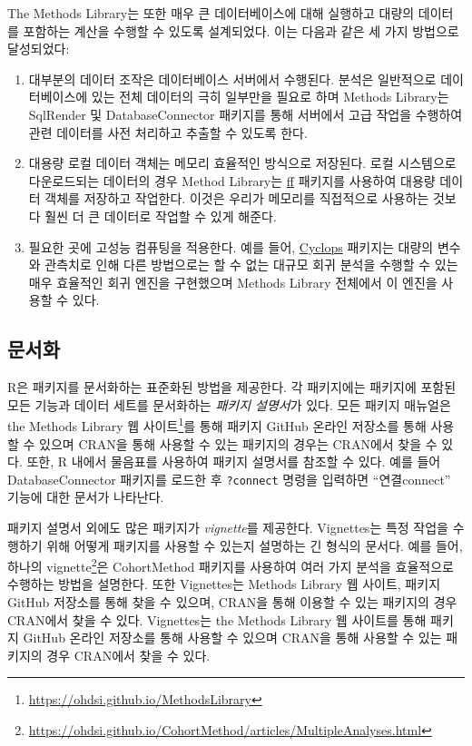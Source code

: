 \documentclass[10.5pt]{book}
\providecommand{\tightlist}{%
  \setlength{\itemsep}{0pt}\setlength{\parskip}{0pt}}
\let\rmarkdownfootnote\footnote%
\def\footnote{\protect\rmarkdownfootnote}
\theoremstyle{definition}
\theoremstyle{definition}
\theoremstyle{definition}
\theoremstyle{remark}
\begin{document}
The Methods Library는 또한 매우 큰 데이터베이스에 대해 실행하고 대량의
데이터를 포함하는 계산을 수행할 수 있도록 설계되었다. 이는 다음과 같은
세 가지 방법으로 달성되었다:

\begin{enumerate}
\def\labelenumi{\arabic{enumi}.}
\tightlist
\item
  대부분의 데이터 조작은 데이터베이스 서버에서 수행된다. 분석은
  일반적으로 데이터베이스에 있는 전체 데이터의 극히 일부만을 필요로 하며
  Methods Library는 SqlRender 및 DatabaseConnector 패키지를 통해
  서버에서 고급 작업을 수행하여 관련 데이터를 사전 처리하고 추출할 수
  있도록 한다.
\item
  대용량 로컬 데이터 객체는 메모리 효율적인 방식으로 저장된다. 로컬
  시스템으로 다운로드되는 데이터의 경우 Method Library는
  \href{https://cran.r-project.org/web/packages/ff}{ff} 패키지를
  사용하여 대용량 데이터 객체를 저장하고 작업한다. 이것은 우리가
  메모리를 직접적으로 사용하는 것보다 훨씬 더 큰 데이터로 작업할 수 있게
  해준다.
\item
  필요한 곳에 고성능 컴퓨팅을 적용한다. 예를 들어,
  \href{https://ohdsi.github.io/Cyclops/}{Cyclops} 패키지는 대량의
  변수와 관측치로 인해 다른 방법으로는 할 수 없는 대규모 회귀 분석을
  수행할 수 있는 매우 효율적인 회귀 엔진을 구현했으며 Methods Library
  전체에서 이 엔진을 사용할 수 있다.
\end{enumerate}

\subsection{문서화}

R은 패키지를 문서화하는 표준화된 방법을 제공한다. 각 패키지에는 패키지에
포함된 모든 기능과 데이터 세트를 문서화하는 \emph{패키지 설명서}가 있다.
모든 패키지 매뉴얼은 the Methods Library 웹 사이트\footnote{\url{https://ohdsi.github.io/MethodsLibrary}}를
통해 패키지 GitHub 온라인 저장소를 통해 사용할 수 있으며 CRAN을 통해
사용할 수 있는 패키지의 경우는 CRAN에서 찾을 수 있다. 또한, R 내에서
물음표를 사용하여 패키지 설명서를 참조할 수 있다. 예를 들어
DatabaseConnector 패키지를 로드한 후 \texttt{?connect} 명령을 입력하면
``연결connect'' 기능에 대한 문서가 나타난다.

패키지 설명서 외에도 많은 패키지가 \emph{vignette}를 제공한다.
Vignettes는 특정 작업을 수행하기 위해 어떻게 패키지를 사용할 수 있는지
설명하는 긴 형식의 문서다. 예를 들어, 하나의 vignette\footnote{\url{https://ohdsi.github.io/CohortMethod/articles/MultipleAnalyses.html}}은
CohortMethod 패키지를 사용하여 여러 가지 분석을 효율적으로 수행하는
방법을 설명한다. 또한 Vignettes는 Methods Library 웹 사이트, 패키지
GitHub 저장소를 통해 찾을 수 있으며, CRAN을 통해 이용할 수 있는 패키지의
경우 CRAN에서 찾을 수 있다. Vignettes는 the Methods Library 웹 사이트를
통해 패키지 GitHub 온라인 저장소를 통해 사용할 수 있으며 CRAN을 통해
사용할 수 있는 패키지의 경우 CRAN에서 찾을 수 있다. 
\end{document}
